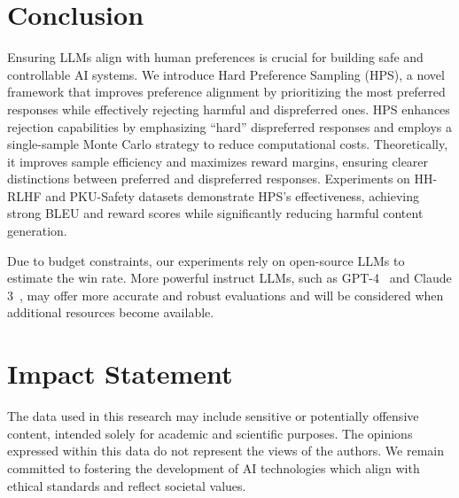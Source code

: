 \vspace{-6pt}
\section{Conclusion}
\label{sec:conclusion}
\vspace{-3pt}
Ensuring LLMs align with human preferences is crucial for building safe and controllable AI systems. We introduce Hard Preference Sampling (HPS), a novel framework that improves preference alignment by prioritizing the most preferred responses while effectively rejecting harmful and dispreferred ones. HPS enhances rejection capabilities by emphasizing ``hard” dispreferred responses and employs a single-sample Monte Carlo strategy to reduce computational costs. Theoretically, it improves sample efficiency and maximizes reward margins, ensuring clearer distinctions between preferred and dispreferred responses. Experiments on HH-RLHF and PKU-Safety datasets demonstrate HPS’s effectiveness, achieving strong BLEU and reward scores while significantly reducing harmful content generation.

Due to budget constraints, our experiments rely on open-source LLMs to estimate the win rate. More powerful instruct LLMs, such as GPT-4~\cite{gpt4} and Claude 3~\cite{claude}, may offer more accurate and robust evaluations and will be considered when additional resources become available.

\section*{Impact Statement}
The data used in this research may include sensitive or potentially offensive content, intended solely for academic and scientific purposes. The opinions expressed within this data do not represent the views of the authors. We remain committed to fostering the development of AI technologies which align with ethical standards and reflect societal values.
 
